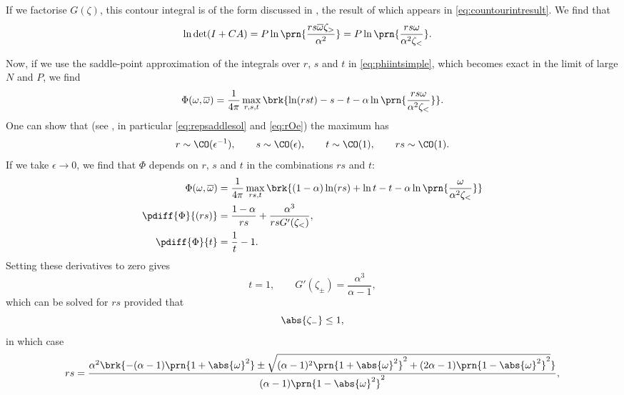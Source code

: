 \documentclass[12pt]{article}
\newcommand{\inv}{^{-1}}
\newcommand{\omb}{\overline{\omega}}
\newcommand{\opo}{\prn{1+\abs{\omega}^2}}
\newcommand{\omo}{\prn{1-\abs{\omega}^2}}
\begin{document}
If we factorise $G(\zeta)$, this contour integral is of the form discussed in , the result of which appears in \eqref{eq:countourintresult}.
We find that
%
\begin{equation}\label{eq:detsimpleresult}
\begin{aligned}
  \ln\det(I+CA) &= P\ln\prn{\frac{rs\omb\zeta_>}{\alpha^2}} = P\ln\prn{\frac{rs\omega}{\alpha^2\zeta_<}}.
\end{aligned}
\end{equation}
%

Now, if we use the saddle-point approximation of the integrals over $r$, $s$ and $t$ in \eqref{eq:phiintsimple}, which becomes exact in the limit of large $N$ and $P$, we find
%
\begin{equation}\label{eq:phisaddlesimple}
  \Phi(\omega,\omb) = \frac{1}{4\pi} \max_{r,s,t} \brk{ \ln(rst) - s - t -\alpha\ln\prn{\frac{rs\omega}{\alpha^2\zeta_<}}}.
\end{equation}
%
One can show that (see , in particular \eqref{eq:repsaddlesol} and \eqref{eq:rOe}) the maximum has
%
\begin{equation}\label{eq:saddleOe}
  r \sim \CO(\epsilon\inv),
  \qquad
  s \sim \CO(\epsilon),
  \qquad
  t \sim \CO(1),
  \qquad
  rs \sim \CO(1).
\end{equation}
%
If we take $\epsilon\to0$, we find that $\Phi$ depends on $r$, $s$ and $t$ in the combinations $rs$ and $t$:
%
\begin{equation}\label{eq:phimaxsimple}
\begin{aligned}
  \Phi(\omega,\omb) &= \frac{1}{4\pi} \max_{rs,t} \brk{ (1-\alpha)\ln(rs)+\ln t - t -\alpha\ln\prn{\frac{\omega}{\alpha^2\zeta_<}}}\\
  \pdiff{\Phi}{(rs)} &= \frac{1-\alpha}{rs} + \frac{\alpha^3}{rs G'(\zeta_<)} ,\\
  \pdiff{\Phi}{t}&= \frac{1}{t} - 1 .
\end{aligned}
\end{equation}
%
Setting these derivatives to zero gives
%
\begin{equation}\label{eq:saddlecond}
  t=1,
  \qquad
  G'(\zeta_\pm)=\frac{\alpha^3}{\alpha-1},
\end{equation}
%
which can be solved for $rs$ provided that
%
\begin{equation}\label{eq:saddlereq}
  \abs{\zeta_-}\leq1,
\end{equation}
%
in which case
%
\begin{equation}\label{eq:saddlesolrs}
\begin{aligned}
  rs &= \frac{\alpha^2 \brk{ -(\alpha-1)\opo \pm \sqrt{ (\alpha-1)^2\opo^2 + (2\alpha-1)\omo^2 } }}{(\alpha-1)\omo^2},\\
\end{aligned}
\end{equation}
\end{document}
